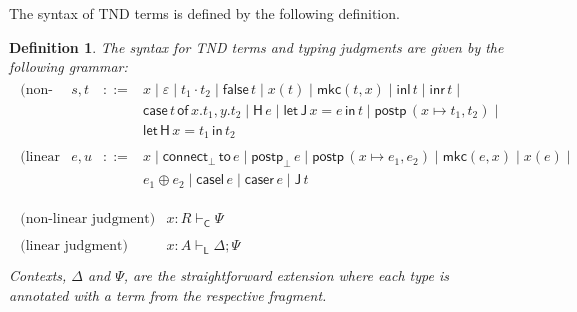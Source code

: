 \documentclass{lmcs}
\newtheorem{definition}[theorem]{Definition}
\newcommand{\DualLNLLogicnt}[1]{\mathit{#1}}
\newcommand{\DualLNLLogicmv}[1]{\mathit{#1}}
\newcommand{\DualLNLLogicsym}[1]{#1}
\begin{document}
The syntax of TND terms is defined by the following definition.
\begin{definition}
  \label{def:TND-terms-syntax}
  The syntax for TND terms and typing judgments are given by the following grammar:
  \[
  \begin{array}{l}
    \begin{array}{cllllll}
    \text{(non-linear terms)} & \DualLNLLogicnt{s},\DualLNLLogicnt{t} & ::= & \DualLNLLogicmv{x} \mid  \varepsilon  \mid  \DualLNLLogicnt{t_{{\mathrm{1}}}}  \cdot  \DualLNLLogicnt{t_{{\mathrm{2}}}}  \mid
          \mathsf{false}\, \DualLNLLogicnt{t}  \mid \DualLNLLogicmv{x}  \DualLNLLogicsym{(}  \DualLNLLogicnt{t}  \DualLNLLogicsym{)} \mid  \mathsf{mkc}( \DualLNLLogicnt{t} , \DualLNLLogicmv{x} )  \mid  \mathsf{inl}\, \DualLNLLogicnt{t}  \mid  \mathsf{inr}\, \DualLNLLogicnt{t}  \mid \\
         & & &  \mathsf{case}\, \DualLNLLogicnt{t} \,\mathsf{of}\, \DualLNLLogicmv{x} . \DualLNLLogicnt{t_{{\mathrm{1}}}} , \DualLNLLogicmv{y} . \DualLNLLogicnt{t_{{\mathrm{2}}}}  \mid
          \mathsf{H}\, \DualLNLLogicnt{e}  \mid  \mathsf{let}\,\mathsf{J}\, \DualLNLLogicmv{x}  =  \DualLNLLogicnt{e} \,\mathsf{in}\, \DualLNLLogicnt{t}  \mid  \mathsf{postp}\,( \DualLNLLogicmv{x}  \mapsto  \DualLNLLogicnt{t_{{\mathrm{1}}}} ,  \DualLNLLogicnt{t_{{\mathrm{2}}}} )  \mid \\
         & & &  \mathsf{let}\,\mathsf{H}\, \DualLNLLogicmv{x}  =  \DualLNLLogicnt{t_{{\mathrm{1}}}} \,\mathsf{in}\, \DualLNLLogicnt{t_{{\mathrm{2}}}} \\
         \\
         \text{(linear terms)} & \DualLNLLogicnt{e},\DualLNLLogicnt{u} & ::= & \DualLNLLogicmv{x} \mid  \mathsf{connect}_\perp\,\mathsf{to}\, \DualLNLLogicnt{e}  \mid  \mathsf{postp}_\perp\, \DualLNLLogicnt{e}  \mid  \mathsf{postp}\,( \DualLNLLogicmv{x}  \mapsto  \DualLNLLogicnt{e_{{\mathrm{1}}}} ,  \DualLNLLogicnt{e_{{\mathrm{2}}}} )  \mid  \mathsf{mkc}( \DualLNLLogicnt{e} , \DualLNLLogicmv{x} )  \mid \DualLNLLogicmv{x}  \DualLNLLogicsym{(}  \DualLNLLogicnt{e}  \DualLNLLogicsym{)} \mid \\
         & & &  \DualLNLLogicnt{e_{{\mathrm{1}}}}  \oplus  \DualLNLLogicnt{e_{{\mathrm{2}}}}  \mid  \mathsf{casel}\, \DualLNLLogicnt{e}  \mid  \mathsf{caser}\, \DualLNLLogicnt{e}  \mid  \mathsf{J}\, \DualLNLLogicnt{t} \\         
  \end{array}
  \\\\
  \begin{array}{cll}
    \text{(non-linear judgment)} &  \DualLNLLogicmv{x}  :  \DualLNLLogicnt{R}  \vdash_{\mathsf{C} }  \Psi \\
    \\
    \text{(linear judgment)} &  \DualLNLLogicmv{x}  :  \DualLNLLogicnt{A}  \vdash_{\mathsf{L} }  \Delta ; \Psi \\
  \end{array}
  \end{array}
  \]
  Contexts, $\Delta$ and $\Psi$, are the straightforward extension
  where each type is annotated with a term from the respective
  fragment.
\end{definition}
\end{document}
